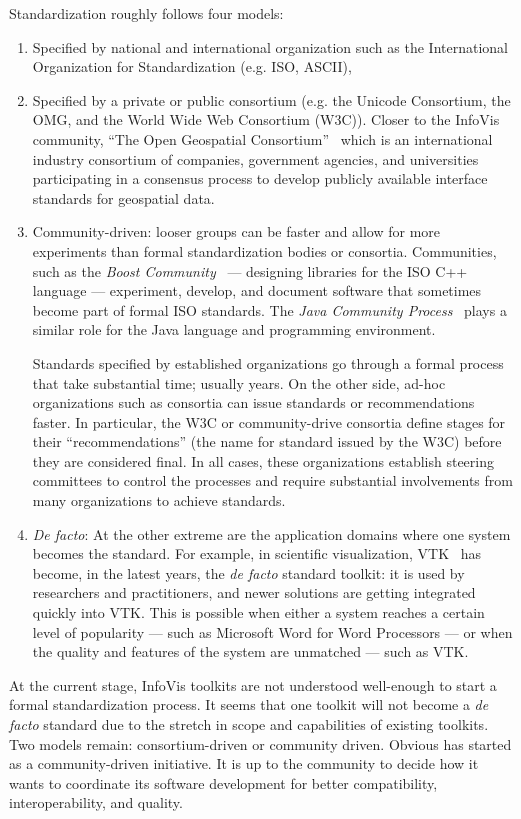 \noindent Standardization roughly follows four models: 
\begin{enumerate}[noitemsep,topsep=0pt]
\item Specified by national and international organization such as the
  International Organization for Standardization (e.g. ISO, ASCII),

\item Specified by a private or public consortium (e.g. the Unicode
  Consortium, the OMG, and the World Wide Web Consortium (W3C)). Closer to
  the InfoVis community, ``The Open Geospatial
  Consortium''~\cite{OpenGeospatial} which is an international
  industry consortium of companies, government agencies, and
  universities participating in a consensus process to develop
  publicly available interface standards for geospatial data.

\item Community-driven: looser groups can be faster and allow for more
  experiments than formal standardization bodies or consortia.
  Communities, such as the \emph{Boost
    Community}~\cite{Boost} --- designing
  libraries for the ISO C++ language --- experiment, develop, and
  document software that sometimes become part of formal ISO
  standards.  The \emph{Java Community
    Process}~\cite{JCP} plays a similar role
  for the Java language and programming environment.

  Standards specified by established organizations go through a formal
  process that take substantial time; usually years.  On the other
  side, ad-hoc organizations such as consortia can issue standards or
  recommendations faster.  In particular, the W3C or community-drive
  consortia define stages for their ``recommendations'' (the name for
  standard issued by the W3C) before they are considered final.  In
  all cases, these organizations establish steering committees to
  control the processes and require substantial involvements from many
  organizations to achieve standards.

\item \textit{De facto}: At the other extreme are the application
  domains where one system becomes the standard.  For example, in
  scientific visualization, VTK~\cite{VTK} has become, in the latest
  years, the \textit{de facto} standard toolkit: it is used by
  researchers and practitioners, and newer solutions are getting
  integrated quickly into VTK.  This is possible when either a
  system reaches a certain level of popularity --- such as Microsoft
  Word for Word Processors --- or when the quality and features of the
  system are unmatched --- such as VTK.
\end{enumerate}

At the current stage, InfoVis toolkits are not understood well-enough
to start a formal standardization process.  It seems that one toolkit
will not become a \textit{de facto} standard due to the stretch in
scope and capabilities of existing toolkits.  Two models remain:
consortium-driven or community driven.  Obvious has started as a
community-driven initiative.  It is up to the community to decide how
it wants to coordinate its software development for better
compatibility, interoperability, and quality.
